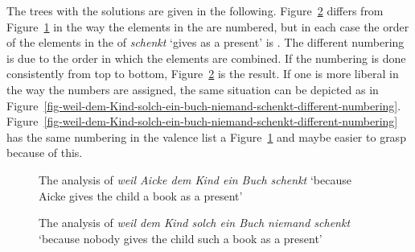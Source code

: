 \begin{enumerate}
The trees with the solutions are given in the
following. Figure~\ref{fig-weil-dem-Kind-solch-ein-buch-niemand-schenkt} differs from
Figure~\ref{fig-weil-Aicke-dem-Kind-ein-buch-schenkt} in the way the elements in the \compsl are
numbered, but in each case the order of the elements in the \compsl of \emph{schenkt} `gives as a
present' is \sliste{ \npnom, \npdat, \npacc }. The different numbering is due to the order in which
the elements are combined. If the numbering is done consistently from top to bottom,
Figure~\ref{fig-weil-dem-Kind-solch-ein-buch-niemand-schenkt} is the result. If one is more liberal
in the way the numbers are assigned, the same situation can be depicted as in
Figure~\ref{fig-weil-dem-Kind-solch-ein-buch-niemand-schenkt-different-numbering}. Figure~\ref{fig-weil-dem-Kind-solch-ein-buch-niemand-schenkt-different-numbering}
has the same numbering in the valence list a Figure~\ref{fig-weil-Aicke-dem-Kind-ein-buch-schenkt}
and maybe easier to grasp because of this.

\begin{figure}
\caption{\label{fig-weil-Aicke-dem-Kind-ein-buch-schenkt}The analysis of \emph{weil Aicke dem Kind
    ein Buch schenkt} `because Aicke gives the child a book as a present'}
\end{figure}

\begin{figure}
\caption{\label{fig-weil-dem-Kind-solch-ein-buch-niemand-schenkt}The analysis of \emph{weil dem Kind
    solch ein Buch niemand schenkt} `because nobody gives the child such a book as a present'}
\end{figure}


\end{enumerate}
